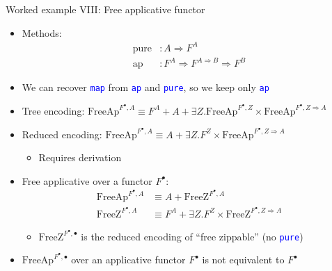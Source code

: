 \documentclass[english,,russian]{beamer}
\begin{document}
\begin{frame}{Worked example VIII: Free applicative functor}
\begin{itemize}
\item {\footnotesize{}\vspace{-0.15cm}}Methods:{\footnotesize{}\vspace{-0.15cm}}
\begin{align*}
\text{pure} & :A\Rightarrow F^{A}\\
\text{ap} & :F^{A}\Rightarrow F^{A\Rightarrow B}\Rightarrow F^{B}
\end{align*}
\item {\footnotesize{}\vspace{-0.15cm}}We can recover \texttt{\textcolor{blue}{\footnotesize{}map}}
from \texttt{\textcolor{blue}{\footnotesize{}ap}} and \texttt{\textcolor{blue}{\footnotesize{}pure}},
so we keep only \texttt{\textcolor{blue}{\footnotesize{}ap}} 
\item Tree encoding: {\footnotesize{}$\text{FreeAp}^{F^{\bullet},A}\equiv F^{A}+A+\exists Z.\text{FreeAp}^{F^{\bullet},Z}\times\text{FreeAp}^{F^{\bullet},Z\Rightarrow A}$}{\footnotesize\par}
\item Reduced encoding:{\footnotesize{} $\text{FreeAp}^{F^{\bullet},A}\equiv A+\exists Z.F^{Z}\times\text{FreeAp}^{F^{\bullet},Z\Rightarrow A}$}{\footnotesize\par}
\begin{itemize}
\item Requires derivation
\end{itemize}
\item Free applicative over a functor $F^{\bullet}$: 
\begin{align*}
\text{FreeAp}^{F^{\bullet},A} & \equiv A+\text{FreeZ}^{F^{\bullet},A}\\
\text{FreeZ}^{F^{\bullet},A} & \equiv F^{A}+\exists Z.F^{Z}\times\text{FreeZ}^{F^{\bullet},Z\Rightarrow A}
\end{align*}

\begin{itemize}
\item $\text{FreeZ}^{F^{\bullet},\bullet}$ is the reduced encoding of ``free
zippable'' (no \texttt{\textcolor{blue}{\footnotesize{}pure}})
\end{itemize}
\item $\text{FreeAp}^{F^{\bullet},\bullet}$ over an applicative functor
$F^{\bullet}$ is not equivalent to $F^{\bullet}$
\end{itemize}
\end{frame}
\end{document}
